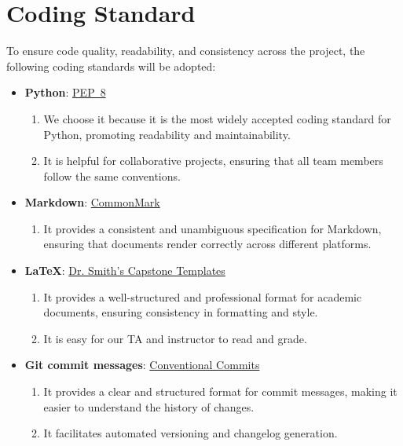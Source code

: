 \documentclass{article}
\begin{document}

\section{Coding Standard}

To ensure code quality, readability, and consistency across the project, 
the following coding standards will be adopted:
\begin{itemize}
  \item \textbf{Python}: \href{https://peps.python.org/pep-0008/}{PEP~8} 
    \begin{enumerate}
      \item We choose it because it is the most widely accepted coding standard for Python, promoting readability and maintainability.
      \item It is helpful for collaborative projects, ensuring that all team members follow the same conventions.
    \end{enumerate}
  \item \textbf{Markdown}: \href{https://commonmark.org/}{CommonMark}
    \begin{enumerate}
      \item It provides a consistent and unambiguous specification for Markdown, ensuring that documents render correctly across different platforms.
    \end{enumerate}
  \item \textbf{LaTeX}: \href{https://github.com/smiths/capTemplate}{Dr. Smith's Capstone Templates}
    \begin{enumerate}
      \item It provides a well-structured and professional format for academic documents, ensuring consistency in formatting and style.
      \item It is easy for our TA and instructor to read and grade.
    \end{enumerate}
  \item \textbf{Git commit messages}: \href{https://www.conventionalcommits.org/}{Conventional Commits}
    \begin{enumerate}
      \item It provides a clear and structured format for commit messages, making it easier to understand the history of changes.
      \item It facilitates automated versioning and changelog generation.
    \end{enumerate}
\end{itemize}
\end{document}
